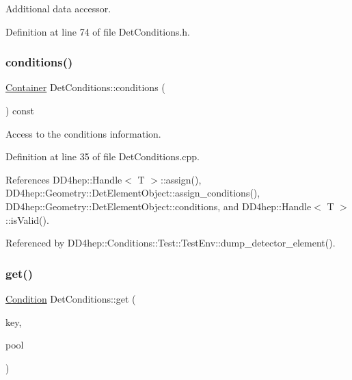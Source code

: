 Additional data accessor. 



Definition at line 74 of file Det\+Conditions.\+h.

\hypertarget{class_d_d4hep_1_1_conditions_1_1_det_conditions_aedbbaf4a4f7e71dc7d6cad819dacad7e}{}\label{class_d_d4hep_1_1_conditions_1_1_det_conditions_aedbbaf4a4f7e71dc7d6cad819dacad7e} 
\subsubsection{\texorpdfstring{conditions()}{conditions()}}
{\footnotesize\ttfamily \hyperlink{class_d_d4hep_1_1_conditions_1_1_container}{Container} Det\+Conditions\+::conditions (\begin{DoxyParamCaption}{ }\end{DoxyParamCaption}) const}



Access to the conditions information. 



Definition at line 35 of file Det\+Conditions.\+cpp.



References D\+D4hep\+::\+Handle$<$ T $>$\+::assign(), D\+D4hep\+::\+Geometry\+::\+Det\+Element\+Object\+::assign\+\_\+conditions(), D\+D4hep\+::\+Geometry\+::\+Det\+Element\+Object\+::conditions, and D\+D4hep\+::\+Handle$<$ T $>$\+::is\+Valid().



Referenced by D\+D4hep\+::\+Conditions\+::\+Test\+::\+Test\+Env\+::dump\+\_\+detector\+\_\+element().

\hypertarget{class_d_d4hep_1_1_conditions_1_1_det_conditions_aae12a60c145a9aee9dc098db5fd8eb7b}{}\label{class_d_d4hep_1_1_conditions_1_1_det_conditions_aae12a60c145a9aee9dc098db5fd8eb7b} 
\subsubsection{\texorpdfstring{get()}{get()}\hspace{0.1cm}{\footnotesize\ttfamily [1/4]}}
{\footnotesize\ttfamily \hyperlink{class_d_d4hep_1_1_conditions_1_1_condition}{Condition} Det\+Conditions\+::get (\begin{DoxyParamCaption}\item[{const std\+::string \&}]{key,  }\item[{const \hyperlink{class_d_d4hep_1_1_conditions_1_1_user_pool}{User\+Pool} \&}]{pool }\end{DoxyParamCaption})}



